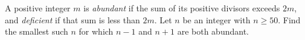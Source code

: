A positive integer $m$ is \emph{abundant} if the sum of its positive divisors exceeds $2m$, and \emph{deficient} if that sum is less than $2m$. Let $n$ be an integer with $n\ge50$. Find the smallest such $n$ for which $n-1$ and $n+1$ are both abundant.
